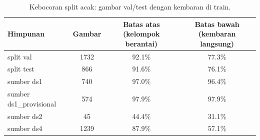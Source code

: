 \begin{table}[!t]
\centering
\caption{Kebocoran split acak: gambar val/test dengan kembaran di train.}
\label{tab:kebocoran}
\footnotesize
\begin{tabular}{lccc}
\hline
\textbf{Himpunan} & \textbf{Gambar} & \textbf{Batas atas (kelompok berantai)} & \textbf{Batas bawah (kembaran langsung)} \\
\hline
split val & 1732 & 92.1\% & 77.3\% \\
split test & 866 & 91.6\% & 76.1\% \\
sumber ds1 & 740 & 97.0\% & 96.4\% \\
sumber ds1\_provisional & 574 & 97.9\% & 97.9\% \\
sumber ds2 & 45 & 44.4\% & 31.1\% \\
sumber ds4 & 1239 & 87.9\% & 57.1\% \\
\hline
\end{tabular}
\end{table}
